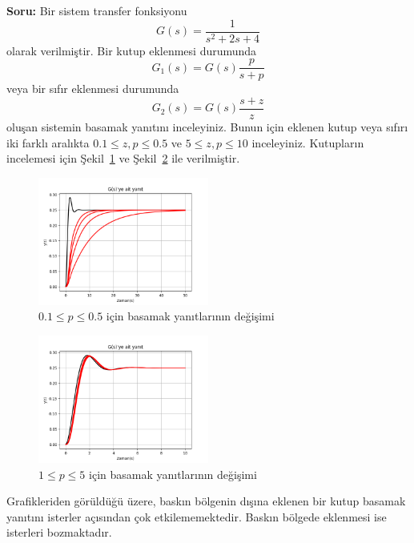 \noindent\textbf{Soru:} Bir sistem transfer fonksiyonu 
\begin{equation}
    G(s)=\frac{1}{s^2+2s+4}
\end{equation}
olarak verilmiştir. Bir kutup eklenmesi durumunda 
\begin{equation}
    G_1(s)=G(s)\frac{p}{s+p}
\end{equation}
veya bir sıfır eklenmesi durumunda 
\begin{equation}
    G_2(s)=G(s)\frac{s+z}{z}
\end{equation}
oluşan sistemin basamak yanıtını inceleyiniz. Bunun için eklenen kutup veya sıfırı iki farklı aralıkta $0.1\leq z,p\leq 0.5$ ve $5\leq z,p\leq10$ inceleyiniz. Kutupların incelemesi için Şekil~\ref{fig:plot1} ve Şekil~\ref{fig:plot2} ile verilmiştir. 

\begin{figure}[!htb]
    \centering
    \includegraphics[width=0.5\textwidth]{plot1}
    \caption{$0.1\leq p\leq 0.5$ için basamak yanıtlarının değişimi}\label{fig:plot1}
\end{figure}

\begin{figure}[!htb]
    \centering
    \includegraphics[width=0.5\textwidth]{plot2}
    \caption{$1\leq p\leq 5$ için basamak yanıtlarının değişimi}\label{fig:plot2}
\end{figure}

Grafikleriden görüldüğü üzere, baskın bölgenin dışına eklenen bir kutup basamak yanıtını isterler açısından çok etkilememektedir. Baskın bölgede eklenmesi ise isterleri bozmaktadır.

